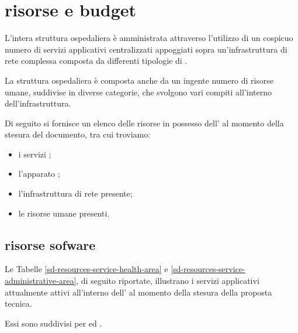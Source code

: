 %
%
\section[Risorse e budget]{risorse e budget}
\label{sd-resources}
L'intera struttura ospedaliera è amministrata attraverso l'utilizzo di un cospicuo numero di servizi applicativi centralizzati appoggiati
sopra un'infrastruttura di rete complessa composta da differenti tipologie di .

La struttura ospedaliera è composta anche da un ingente numero di risorse umane, suddivise in diverse categorie, che svolgono vari compiti all'interno dell'infrastruttura.

Di seguito si fornisce un elenco delle risorse in possesso dell'\entity{} al momento della stesura del documento, tra cui troviamo:

\begin{itemize}
\item{i servizi ;}
\item{l'apparato ;}
\item{l'infrastruttura di rete presente;}
\item{le risorse umane presenti.}
\end{itemize}

\subsection[Risorse software]{risorse sofware}
\label{sd-resources-software}
Le Tabelle \ref{sd-resources-service-health-area} e \ref{sd-resources-service-administrative-area}, di seguito riportate, illustrano i servizi applicativi attualmente attivi all'interno dell'\entity{} al momento della stesura della proposta tecnica. 

Essi sono suddivisi per  ed .

